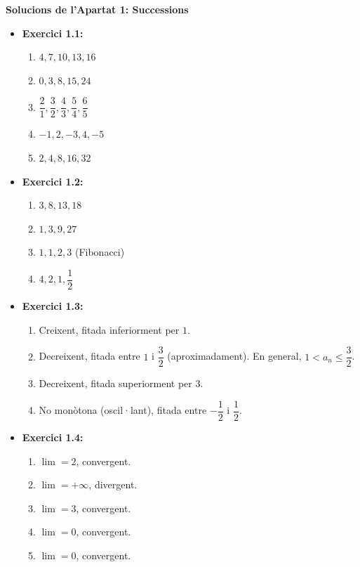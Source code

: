\documentclass[12pt]{article}
\begin{document}
\begin{solucio}
\textbf{Solucions de l'Apartat 1: Successions}
\begin{itemize}
    \item \textbf{Exercici 1.1:}
    \begin{enumerate}[label=\alph*)]
        \item $4, 7, 10, 13, 16$
        \item $0, 3, 8, 15, 24$
        \item $\dfrac{2}{1}, \dfrac{3}{2}, \dfrac{4}{3}, \dfrac{5}{4}, \dfrac{6}{5}$
        \item $-1, 2, -3, 4, -5$
        \item $2, 4, 8, 16, 32$
    \end{enumerate}
    \item \textbf{Exercici 1.2:}
    \begin{enumerate}[label=\alph*)]
        \item $3, 8, 13, 18$
        \item $1, 3, 9, 27$
        \item $1, 1, 2, 3$ (Fibonacci)
        \item $4, 2, 1, \dfrac{1}{2}$
    \end{enumerate}
    \item \textbf{Exercici 1.3:}
    \begin{enumerate}[label=\alph*)]
        \item Creixent, fitada inferiorment per $1$.
        \item Decreixent, fitada entre $1$ i $\dfrac{3}{2}$ (aproximadament). En general, $1 < a_n \le \dfrac{3}{2}$.
        \item Decreixent, fitada superiorment per $3$.
        \item No monòtona (oscil·lant), fitada entre $-\dfrac{1}{2}$ i $\dfrac{1}{2}$.
    \end{enumerate}
    \item \textbf{Exercici 1.4:}
    \begin{enumerate}[label=\alph*)]
        \item $\lim = 2$, convergent.
        \item $\lim = +\infty$, divergent.
        \item $\lim = 3$, convergent.
        \item $\lim = 0$, convergent.
        \item $\lim = 0$, convergent.
    \end{enumerate}
\end{itemize}
\end{solucio}
\end{document}
